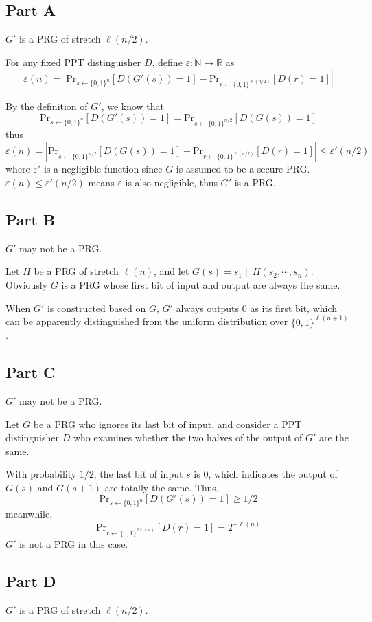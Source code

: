 \documentclass[8pt]{article}
\theoremstyle{compact}
\def\le{\leqslant}
\def\ge{\geqslant}
\begin{document}
\subsection*{Part A}
$G'$ is a PRG of stretch $\ell(n/2)$.

For any fixed PPT distinguisher $D$, define $\varepsilon: \mathbb N \to \mathbb R$ as $$\varepsilon(n) = \left| \text{Pr}_{s \gets \{0, 1\}^n}[D(G'(s)) = 1] - \text{Pr}_{r \gets \{0, 1\}^{\ell(n/2)}}[D(r) = 1]\right|$$

By the definition of $G'$, we know that $$\text{Pr}_{s \gets \{0, 1\}^n}[D(G'(s)) = 1] = \text{Pr}_{s \gets \{0, 1\}^{n/2}}[D(G(s)) = 1]$$
thus $$\varepsilon(n) = \left| \text{Pr}_{s \gets \{0, 1\}^{n/2}}[D(G(s)) = 1] - \text{Pr}_{r \gets \{0, 1\}^{\ell(n/2)}}[D(r) = 1]\right| \le \varepsilon'(n/2)$$
where $\varepsilon'$ is a negligible function since $G$ is assumed to be a secure PRG. $\varepsilon(n) \le \varepsilon'(n/2)$ means $\varepsilon$ is also negligible, thus $G'$ is a PRG.

\subsection*{Part B}
$G'$ may not be a PRG.

Let $H$ be a PRG of stretch $\ell(n)$, and let $G(s) = s_1 \| H(s_2, \cdots, s_n)$. Obviously $G$ is a PRG whose first bit of input and output are always the same.

When $G'$ is constructed based on $G$, $G'$ always outputs $0$ as its first bit, which can be apparently distinguished from the uniform distribution over $\{0, 1\}^{\ell(n + 1)}$.

\subsection*{Part C}
$G'$ may not be a PRG.

Let $G$ be a PRG who ignores its last bit of input, and consider a PPT distinguisher $D$ who examines whether the two halves of the output of $G'$ are the same.

With probability $1/2$, the last bit of input $s$ is $0$, which indicates the output of $G(s)$ and $G(s + 1)$ are totally the same. Thus, $$\text{Pr}_{s \gets \{0, 1\}^n}[D(G'(s)) = 1] \ge 1/2$$meanwhile, $$\text{Pr}_{r \gets \{0, 1\}^{2\ell(n)}}[D(r) = 1] = 2^{-\ell(n)}$$ $G'$ is not a PRG in this case.

\subsection*{Part D}
$G'$ is a PRG of stretch $\ell(n/2)$.
\end{document}
